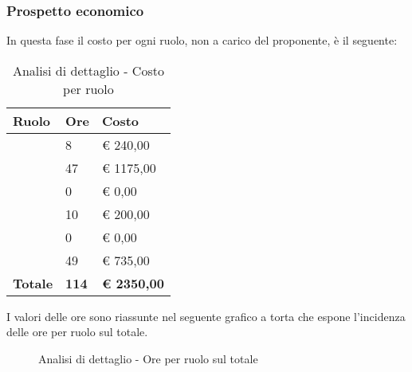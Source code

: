 		\subsubsection{Prospetto economico} %
		\label{ssub:prospetto_economico}
		In questa fase il costo per ogni ruolo, non a carico del proponente\gloss{}, è il seguente: \\
			\begin{table}[!ht]
				\begin{center}
					\begin{tabularx}{0.65\textwidth}{|l|l|X|}
						\hline
						\textbf{Ruolo} & \textbf{Ore} & \textbf{Costo} \\
						\hline
						\roleProjectManager & 8 & \euro{} 240,00 \\
						\hline
						\roleAnalyst & 47 & \euro{} 1175,00 \\
						\hline
						\roleDesigner & 0 & \euro{} 0,00 \\
						\hline
						\roleAdministrator & 10 & \euro{} 200,00 \\
						\hline
						\roleProgrammer & 0 & \euro{} 0,00 \\
						\hline
						\roleVerifier & 49 & \euro{} 735,00 \\
						\hline
						\textbf{Totale} & \textbf{114} & \textbf{\euro{} 2350,00} \\
						\hline
					\end{tabularx}
				\end{center}
			\caption{Analisi di dettaglio - Costo per ruolo}
			\end{table}

			\noindent
			I valori delle ore sono riassunte nel seguente grafico a torta che espone l’incidenza delle ore per ruolo sul totale.
			\begin{center}
				\begin{figure}[htbp]
				\vspace{0.8cm}
				\caption{Analisi di dettaglio - Ore per ruolo sul totale}
				\end{figure}
			\end{center}

